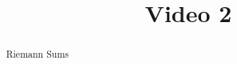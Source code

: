 \documentclass[handout]{ximera}
\title{Video 2}
\begin{document}
\begin{abstract}
Riemann Sums
\end{abstract}

\maketitle

\end{document}
